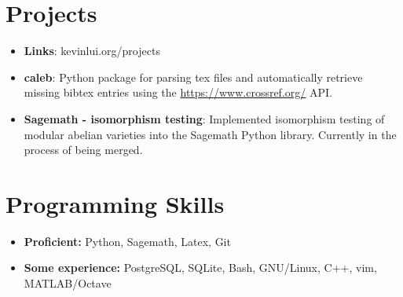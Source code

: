 \documentclass[letterpaper,11pt]{article}
\newcommand{\resumeItem}[2]{
  \item\small{
    \textbf{#1}{: #2 \vspace{-2pt}}
  }
}
\newcommand{\resumeSubItem}[2]{\resumeItem{#1}{#2}\vspace{-4pt}}
\newcommand{\resumeSubHeadingListStart}{\begin{itemize}[leftmargin=*]}
\newcommand{\resumeSubHeadingListEnd}{\end{itemize}}
\begin{document}
\section{Projects}
\resumeSubHeadingListStart
\resumeSubItem{Links}{kevinlui.org/projects}
\resumeSubItem{caleb}{Python package for parsing tex files and automatically
retrieve missing bibtex entries using the \url{https://www.crossref.org/} API.}
\resumeSubItem{Sagemath - isomorphism testing}{Implemented isomorphism testing of
modular abelian varieties into the Sagemath Python library. Currently in the
process of being merged.}
\resumeSubHeadingListEnd


\section{Programming Skills}
  \resumeSubHeadingListStart
    \item{
            \textbf{Proficient: }{Python, Sagemath, Latex, Git}
    }
    \item{
            \textbf{Some experience: }{PostgreSQL, SQLite, Bash, GNU/Linux,
            C++, vim, MATLAB/Octave}
    }
  \resumeSubHeadingListEnd


\end{document}
